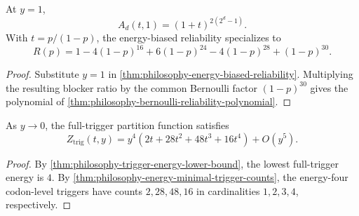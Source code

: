 \begin{corollary}
\label{cor:philosophy-energy-biased-uniform-specialization}
At $y=1$,
$$
  A_{d}(t,1)=(1+t)^{2(2^{d}-1)}.
$$
With $t=p/(1-p)$, the energy-biased reliability specializes to
$$
  R(p)
  =
  1-4(1-p)^{16}
  +6(1-p)^{24}
  -4(1-p)^{28}
  +(1-p)^{30}.
$$
\end{corollary}
\begin{proof}
Substitute $y=1$ in
\autoref{thm:philosophy-energy-biased-reliability}. Multiplying the
resulting blocker ratio by the common Bernoulli factor
$(1-p)^{30}$ gives the polynomial of
\autoref{thm:philosophy-bernoulli-reliability-polynomial}.
\end{proof}

\begin{corollary}
\label{cor:philosophy-energy-biased-low-energy-expansion}
As $y\to 0$, the full-trigger partition function satisfies
$$
  Z_{\mathrm{trig}}(t,y)
  =
  y^{4}(2t+28t^{2}+48t^{3}+16t^{4})
  +
  O(y^{5}).
$$
\end{corollary}
\begin{proof}
By \autoref{thm:philosophy-trigger-energy-lower-bound}, the lowest
full-trigger energy is $4$. By
\autoref{thm:philosophy-energy-minimal-trigger-counts}, the
energy-four codon-level triggers have counts $2,28,48,16$ in
cardinalities $1,2,3,4$, respectively.
\end{proof}

